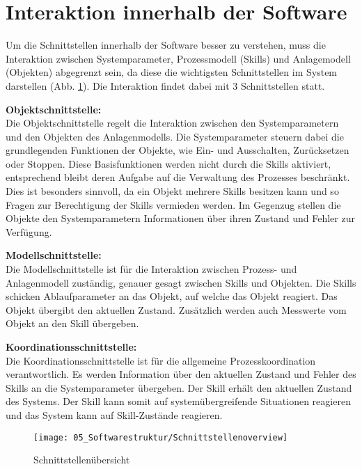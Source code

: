 \section{Interaktion innerhalb der Software} \label{Softwareinteraktion}

	Um die Schnittstellen innerhalb der Software besser zu verstehen, muss die Interaktion zwischen Systemparameter, Prozessmodell (Skills) und Anlagemodell (Objekten) abgegrenzt sein, da diese die wichtigsten Schnittstellen im System darstellen (Abb. \ref{fig:Schnittstellenübersicht}). Die Interaktion findet dabei mit 3 Schnittstellen statt. 
	
	\textbf{Objektschnittstelle:}
	\vspace{2mm} 
	\\
	Die Objektschnittstelle regelt die Interaktion zwischen den Systemparametern und den Objekten des Anlagenmodells. Die Systemparameter steuern dabei die grundlegenden Funktionen der Objekte, wie Ein- und Ausschalten, Zurücksetzen oder Stoppen. Diese Basisfunktionen werden nicht durch die Skills aktiviert, entsprechend bleibt deren Aufgabe auf die Verwaltung des Prozesses beschränkt. Dies ist besonders sinnvoll, da ein Objekt mehrere Skills besitzen kann und so Fragen zur Berechtigung der Skills vermieden werden. Im Gegenzug stellen die Objekte den Systemparametern Informationen über ihren Zustand und Fehler zur Verfügung.
	
	\textbf{Modellschnittstelle:}
	\vspace{2mm} 
	\\
	Die Modellschnittstelle ist für die Interaktion zwischen Prozess- und Anlagenmodell zuständig, genauer gesagt zwischen Skills und Objekten. Die Skills schicken Ablaufparameter an das Objekt, auf welche das Objekt reagiert. Das Objekt übergibt den aktuellen Zustand. Zusätzlich werden auch Messwerte vom Objekt an den Skill übergeben. 
	
	\textbf{Koordinationsschnittstelle:}
	\vspace{2mm} 
	\\
	Die Koordinationsschnittstelle ist für die allgemeine Prozesskoordination verantwortlich. Es werden Information über den aktuellen Zustand und Fehler des Skills an die Systemparameter übergeben. Der Skill erhält den aktuellen Zustand des Systems. Der Skill kann somit auf systemübergreifende Situationen reagieren und das System kann auf Skill-Zustände reagieren.  
	
	\begin{figure}[h!]
		\centering
		\texttt{[image: 05\_Softwarestruktur/Schnittstellenoverview]}
		\captionsetup{justification=centering}
		\caption{Schnittstellenübersicht}
		\label{fig:Schnittstellenübersicht}
	\end{figure}
	
